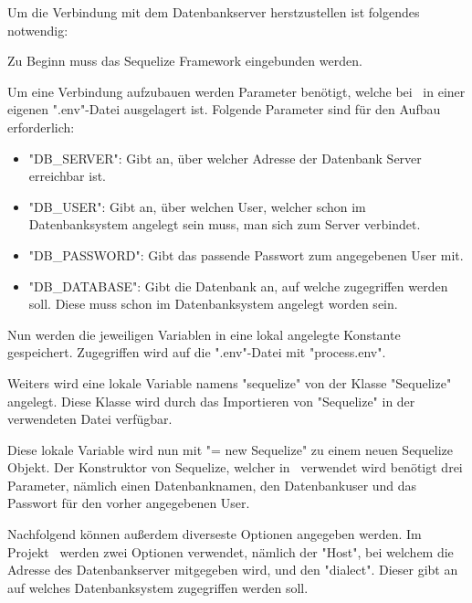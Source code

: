 
Um die Verbindung mit dem Datenbankserver herstzustellen ist folgendes notwendig:

Zu Beginn muss das Sequelize Framework eingebunden werden.


Um eine Verbindung aufzubauen werden Parameter benötigt, welche bei \ZELIA\ in einer eigenen ".env"-Datei ausgelagert ist. Folgende Parameter sind für den Aufbau erforderlich:

\begin{itemize}
    \item "DB\_SERVER": Gibt an, über welcher Adresse der Datenbank Server erreichbar ist.
    \item "DB\_USER": Gibt an, über welchen User, welcher schon im Datenbanksystem angelegt sein muss, man sich zum Server verbindet.
    \item "DB\_PASSWORD": Gibt das passende Passwort zum angegebenen User mit.
    \item "DB\_DATABASE": Gibt die Datenbank an, auf welche zugegriffen werden soll. Diese muss schon im Datenbanksystem angelegt worden sein.
\end{itemize}

Nun werden die jeweiligen Variablen in eine lokal angelegte Konstante gespeichert. Zugegriffen wird auf die ".env"-Datei mit "{\ttfamily process.env}".


Weiters wird eine lokale Variable namens "sequelize" von der Klasse "Sequelize" angelegt. Diese Klasse wird durch das Importieren von "Sequelize" in der verwendeten Datei verfügbar.


Diese lokale Variable wird nun mit "{\ttfamily = new Sequelize}" zu einem neuen Sequelize Objekt. Der Konstruktor von Sequelize, welcher in \ZELIA\ verwendet wird benötigt drei Parameter, nämlich einen Datenbanknamen, den Datenbankuser und das Passwort für den vorher angegebenen User. 

Nachfolgend können außerdem diverseste Optionen angegeben werden. Im Projekt \ZELIA\ werden zwei Optionen verwendet, nämlich der "Host", bei welchem die Adresse des Datenbankserver mitgegeben wird, und den "dialect". Dieser gibt an auf welches Datenbanksystem zugegriffen werden soll.

